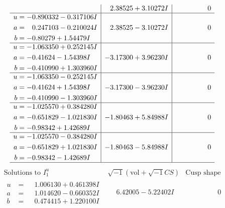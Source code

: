 \documentclass[1p]{elsarticle_modified}
\theoremstyle{definition}
\newcommand{\I}{\sqrt{-1}}
\begin{document}
$$\begin{array}{c|c|c}
 & \phantom{-}2.38525 + 3.10272 I & \phantom{-0.000000 } 0 \\ \hline\begin{aligned}
u &= -0.890332 - 0.317106 I \\
a &= \phantom{-}0.247103 - 0.210024 I \\
b &= -0.80279 + 1.54479 I\end{aligned}
 & \phantom{-}2.38525 - 3.10272 I & \phantom{-0.000000 } 0 \\ \hline\begin{aligned}
u &= -1.063350 + 0.252145 I \\
a &= -0.41624 - 1.54398 I \\
b &= -0.410990 + 1.303960 I\end{aligned}
 & -3.17300 + 3.96230 I & \phantom{-0.000000 } 0 \\ \hline\begin{aligned}
u &= -1.063350 - 0.252145 I \\
a &= -0.41624 + 1.54398 I \\
b &= -0.410990 - 1.303960 I\end{aligned}
 & -3.17300 - 3.96230 I & \phantom{-0.000000 } 0 \\ \hline\begin{aligned}
u &= -1.025570 + 0.384280 I \\
a &= -0.651829 - 1.021830 I \\
b &= -0.98342 + 1.42689 I\end{aligned}
 & -1.80463 + 5.84988 I & \phantom{-0.000000 } 0 \\ \hline\begin{aligned}
u &= -1.025570 - 0.384280 I \\
a &= -0.651829 + 1.021830 I \\
b &= -0.98342 - 1.42689 I\end{aligned}
 & -1.80463 - 5.84988 I & \phantom{-0.000000 } 0\\
 \hline 
 \end{array}$$\newpage$$\begin{array}{c|c|c}  
\text{Solutions to }I^u_{1}& \I (\text{vol} + \sqrt{-1}CS) & \text{Cusp shape}\\
 \hline 
\begin{aligned}
u &= \phantom{-}1.006130 + 0.461398 I \\
a &= \phantom{-}1.014620 - 0.660352 I \\
b &= \phantom{-}0.474415 + 1.220100 I\end{aligned}
 & \phantom{-}6.42005 - 5.22402 I & \phantom{-0.000000 } 0 \\ \hline\begin{aligned}

\end{aligned}
\end{array}$$
\end{document}
